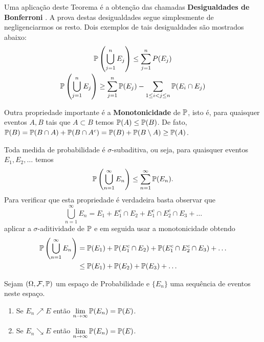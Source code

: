 Uma aplicação deste Teorema é a obtenção das
chamadas {\bf Desigualdades de Bonferroni} .
A prova destas desigualdades segue simplesmente de negligenciarmos 
os resto. Dois exemplos de tais desigualdades são mostrados
abaixo:
\[ 
\begin{array}{c}
	\displaystyle
	\P \left( \bigcup_{j=1}^{n} E_j \right) 
	\leq 
	\sum_{j=1}^n P(E_j)
	\\[0.5cm]
	\displaystyle
	\P \left( \bigcup_{j=1}^{n} E_j \right) 
	\geq
	\sum_{j=1}^n \P(E_j) - \sum_{1\leq i<j\leq n} \P(E_i\cap E_j)	
\end{array}
\]

Outra propriedade importante é a {\bf Monotonicidade} de $\P$, isto é, 
para quaisquer eventos $A,B$ tais que $A\subset B$ temos 
$\P(A)\leq \P(B)$. De fato, 
$\P(B)=\P(B\cap A)+\P(B\cap A^c)= \P(B)+\P(B\setminus A)\geq \P(A)$.

Toda medida de probabilidade é $\sigma$-subaditiva, ou seja, 
para quaisquer eventos $E_1,E_2,\ldots$ temos 
	\[
		\P\left( \bigcup_{n=1}^{\infty} E_n\right)
		\leq 
		\sum_{n=1}^{\infty} \P(E_n).
	\]
Para verificar que esta propriedade é verdadeira basta observar que 
\[
	\bigcup_{n=1}^{\infty} E_n = E_1+E_1^c\cap E_2 + E_1^c\cap E_2^c\cap E_3 +\ldots
\]
aplicar a $\sigma$-aditividade de $\P$ e em seguida usar a monotonicidade 
obtendo
	\begin{align*}
	\P\left( \bigcup_{n=1}^{\infty} E_n\right)
	&=
	\P(E_1)+\P(E_1^c\cap E_2) + \P(E_1^c\cap E_2^c\cap E_3) +\ldots
	\\
	&\leq
	\P(E_1) + \P(E_2) + \P(E_3) +\ldots
	\end{align*}
	
\begin{teorema}
	Sejam $(\Omega,\F,\P)$ um espaço de Probabilidade e
	$\{E_n\}$ uma sequência de eventos neste espaço.
	\begin{enumerate}
		\item
		Se $E_n\nearrow E$ então 
		$\displaystyle\lim_{n\to\infty}\P(E_n)=\P(E)$.
		\item 
		Se $E_n\searrow E$ então 
		$\displaystyle\lim_{n\to\infty}\P(E_n)=\P(E)$.		
	\end{enumerate}
\end{teorema}